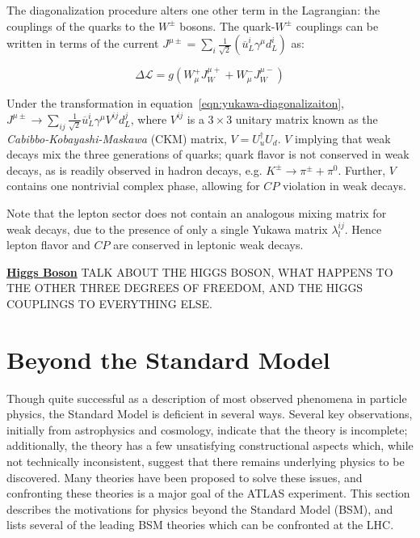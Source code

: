 The diagonalization procedure alters one other term in the Lagrangian: the couplings of the quarks to the $W^{\pm}$ bosons. The quark-$W^{\pm}$ couplings can be written in terms of the current $J^{\mu\pm}=\sum_{i} \frac1{\sqrt{2}}\left(\overline{u}_L^i\gamma^{\mu}d_L^i\right)$ as:

\begin{equation}
	\Delta\mathcal{L} = g (W^+_{\mu}J^{\mu+}_W + W^{-}_{\mu}J^{\mu -}_{W})
\end{equation}

Under the transformation in equation~\ref{eqn:yukawa-diagonalizaiton}, $J^{\mu\pm}\rightarrow \sum_{ij}\frac{1}{\sqrt{2}} \overline{u}_L^i \gamma^{\mu} V^{ij} d_L^j$, where $V^{ij}$ is a $3\times 3$ unitary matrix known as the \emph{Cabibbo-Kobayashi-Maskawa} (CKM) matrix, $V = U_{u}^{\dagger} U_d$. $V$ implying that weak decays mix the three generations of quarks; quark flavor is not conserved in weak decays, as is readily observed in hadron decays, e.g. $K^{\pm}\rightarrow \pi^{\pm}+\pi^0$. Further, $V$ contains one nontrivial complex phase, allowing for $CP$ violation in weak decays. 

Note that the lepton sector does not contain an analogous mixing matrix for weak decays, due to the presence of only a single Yukawa matrix $\lambda^{ij}_l$. Hence lepton flavor and $CP$ are conserved in leptonic weak decays.

\underline{\textbf{Higgs Boson}}
TALK ABOUT THE HIGGS BOSON, WHAT HAPPENS TO THE OTHER THREE DEGREES OF FREEDOM, AND THE HIGGS COUPLINGS TO EVERYTHING ELSE.




\section{Beyond the Standard Model}\label{sec:beyond-the-standard-model}
Though quite successful as a description of most observed phenomena in particle physics, the Standard Model is deficient in several ways. Several key observations, initially from astrophysics and cosmology, indicate that the theory is incomplete; additionally, the theory has a few unsatisfying constructional aspects which, while not technically inconsistent, suggest that there remains underlying physics to be discovered. Many theories have been proposed to solve these issues, and confronting these theories is a major goal of the ATLAS experiment. This section describes the motivations for physics beyond the Standard Model (BSM), and lists several of the leading BSM theories which can be confronted at the LHC.

